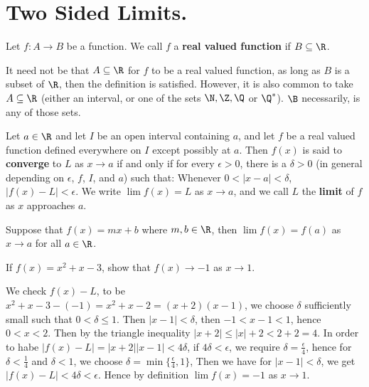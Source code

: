 
\section{Two Sided Limits.}

\begin{definition}
    Let $f:A \rightarrow B$ be a function. We call $f$ a \textbf{real valued 
    function} if $B \subseteq \R$.		
\end{definition}

It need not be that $A \subseteq \R$ for  $f$ to be a real valued function, as 
long as  $B$ is a subset of  $\R$, then the definition is satisfied. However, it 
is also common to take  $A \subseteq \R$  (either an interval, or one of the sets 
$\N, \Z, \Q$ or  $\Q^*$). $\B$ necessarily, is any of those sets.
\begin{definition}
    Let $a \in \R$ and let $I$ be an open interval containing  $a$, and let  $f$ 
    be a real valued function defined everywhere on $I$ except possibly at  $a$. 
    Then $f(x)$ is said to \textbf{converge} to  $L$ as  $x \rightarrow a$ if 
    and only if for every  $\epsilon>0$, there is a $\delta>0$  (in general 
    depending on $\epsilon$, $f$,  $I$, and  $a$) such that: Whenever $0<|x-a|<\delta$, 
    $|f(x)-L|< \epsilon$. We write  $\lim{f(x)}=L$ as  $x \rightarrow a$, and 
we call  $L$ the \textbf{limit} of $f$ as  $x$ approaches  $a$.
\end{definition}

\begin{example}
    Suppose that $f(x)=mx+b$ where  $m,b \in \R$, then  $\lim{f(x)}=f(a)$ as 
    $x \rightarrow a$ for all $a \in \R$.	
\end{example}

\begin{example}
    If $f(x)=x^2+x-3$, show that  $f(x) \rightarrow -1$ as  $x \rightarrow 1$.
\end{example} 
\begin{solution}
    We check $f(x)-L$, to be  $x^2+x-3-(-1)=x^2+x-2=(x+2)(x-1)$, we choose  $\delta$ 
    sufficiently small such that  $0 < \delta \leq 1$. Then  $|x-1|<\delta$, then 
     $-1<x-1<1$, hence  $0<x<2$. Then by the triangle inequality $|x+2| \leq |x|+2
     <2+2=4$. In order to habe  $|f(x)-L|=|x+2||x-1|<4\delta$, if  $4\delta < \epsilon$, we 
     require $\delta=\frac{\epsilon}{4}$, hence for $\delta<\frac{1}{4}$ and $\delta<1$, 
     we choose  $\delta=\min\{\frac{\epsilon}{4},1\}$, Then we have for $|x-1|<\delta$, 
     we get $|f(x)-L|<4\delta<\epsilon$. Hence by definition $\lim{f(x)}=-1$ as 
      $x \rightarrow 1$.
\end{solution}


